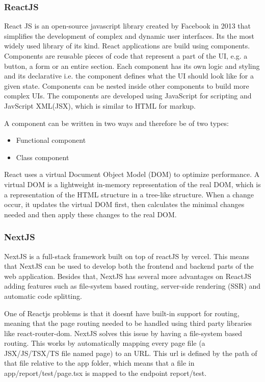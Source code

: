 \subsubsection{ReactJS}
React JS is an open-source javascript library created by Facebook in 2013 that
simplifies the development of complex and dynamic user interfaces. Its the most widely
used library of its kind.
React applications are build using components. Components are reusable pieces of
code that represent a part of the UI, e.g. a button, a form or an entire section.
Each component has its own logic and styling and its declarative i.e. the
component defines what the UI should look like for a given state.
Components can be nested inside other components to build more complex UIs.
The components are developed using JavaScript for scripting and JavScript XML(JSX),
which is similar to HTML for markup.

A component can be written in two ways and therefore be of two types:
\begin{itemize}
	\item Functional component
	\item Class component
\end{itemize}

React uses a virtual Document Object Model (DOM) to optimize performance. A virtual
DOM is a lightweight in-memory representation of the real DOM, which is a
representation of the HTML structure in a tree-like structure. When a change
occur, it updates the virtual DOM first, then calculates the minimal changes needed
and then apply these changes to the real DOM\cite{bawane2022review}.

\subsubsection{NextJS}
NextJS is a full-stack framework built on top of reactJS by vercel. This means
that NextJS can be used to develop both the frontend and backend parts of the
web application. Besides that, NextJS has several more advantages on ReactJS
adding features such as file-system based routing, server-side rendering (SSR)
and automatic code splitting.

One of Reactjs problems is that it doesn\'t have built-in support for routing,
meaning that the page routing needed to be handled using third party libraries
like react-router-dom. NextJS solves this issue by having a file-system based
routing. This works by automatically mapping every page file (a JSX/JS/TSX/TS
file named page) to an URL. This url is defined by the path of that file
relative to the app folder, which means that a file in app/report/test/page.tsx
is mapped to the endpoint report/test.


